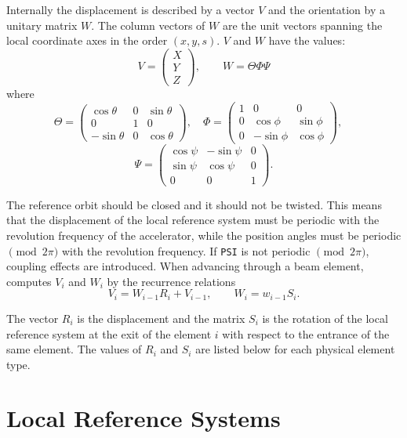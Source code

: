 Internally the displacement is described by a vector $V$
and the orientation by a unitary matrix $W$.
The column vectors of $W$ are the unit vectors spanning 
the local coordinate axes in the order $(x, y, s)$.
$V$ and $W$ have the values:
\[
V=\left(\begin{array}{c}
    X \\
    Y \\
    Z
  \end{array}\right),
\qquad
W=\Theta\Phi\Psi
\]
where
\[
\Theta=\left(\begin{array}{ccc}
    \cos\theta &  0 &  \sin\theta \\
    0         &  1 &   0 \\
    -\sin\theta &  0 &  \cos\theta
  \end{array}\right),
\quad
\Phi=\left(\begin{array}{ccc}
    1 &  0        &  0 \\
    0 &  \cos\phi &  \sin\phi \\
    0 & -\sin\phi &  \cos\phi
  \end{array}\right),
\quad
\]
\[
\Psi=\left(\begin{array}{ccc}
    \cos\psi & -\sin\psi &  0 \\
    \sin\psi &  \cos\psi &  0 \\
    0        &  0        &  1
  \end{array}\right).
\]

The reference orbit should be closed and it should not be twisted.
This means that the displacement of the local reference system
must be periodic with the revolution frequency of the accelerator,
while the position angles must be periodic $\pmod{2\pi}$
with the revolution frequency.
If \texttt{PSI} is not periodic $\pmod{2\pi}$, 
coupling effects are introduced.
When advancing through a beam element,
\opalmap computes $V_i$ and $W_i$
by the recurrence relations
\[
V_i = W_{i-1}R_i + V_{i-1}, \qquad
W_i = w_{i-1}S_i.
\]

The vector $R_i$ is the displacement and the matrix
$S_i$ is the rotation of the local reference system 
at the exit of the element $i$ with respect to the entrance 
of the same element.
The values of $R_i$ and $S_i$
are listed below for each physical element type.

\section{Local Reference Systems}
